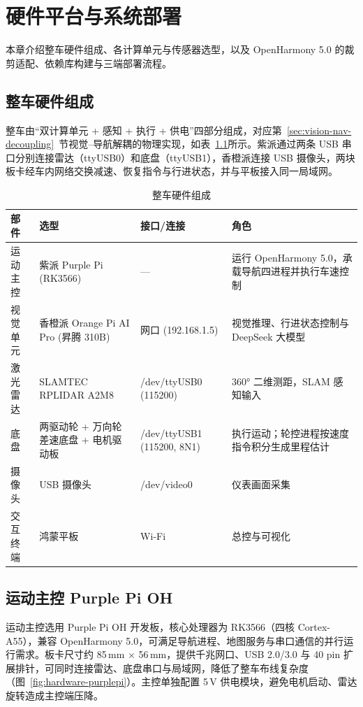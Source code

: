 \chapter{硬件平台与系统部署}
\label{ch:hardware-deploy}

本章介绍整车硬件组成、各计算单元与传感器选型，以及 OpenHarmony 5.0 的裁剪适配、依赖库构建与三端部署流程。

\section{整车硬件组成}
\label{sec:hardware-composition}

整车由“双计算单元 + 感知 + 执行 + 供电”四部分组成，对应第~\ref{sec:vision-nav-decoupling}~节视觉--导航解耦的物理实现，如表~\ref{tab:hardware}所示。紫派通过两条 USB 串口分别连接雷达（ttyUSB0）和底盘（ttyUSB1），香橙派连接 USB 摄像头，两块板卡经车内网络交换减速、恢复指令与行进状态，并与平板接入同一局域网。

\begin{table}[htbp]
\centering
\caption{整车硬件组成}
\label{tab:hardware}
\begin{tabularx}{\textwidth}{p{2.2cm}p{3cm}p{2.5cm}X}
\toprule
\textbf{部件} & \textbf{选型} & \textbf{接口/连接} & \textbf{角色} \\
\midrule
运动主控 & 紫派 Purple Pi (RK3566) & --- & 运行 OpenHarmony 5.0，承载导航四进程并执行车速控制 \\
视觉单元 & 香橙派 Orange Pi AI Pro (昇腾 310B) & 网口 (192.168.1.5) & 视觉推理、行进状态控制与 DeepSeek 大模型 \\
激光雷达 & SLAMTEC RPLIDAR A2M8 & /dev/ttyUSB0 (115200) & 360° 二维测距，SLAM 感知输入 \\
底盘 & 两驱动轮 + 万向轮差速底盘 + 电机驱动板 & /dev/ttyUSB1 (115200, 8N1) & 执行运动；轮控进程按速度指令积分生成里程估计 \\
摄像头 & USB 摄像头 & /dev/video0 & 仪表画面采集 \\
交互终端 & 鸿蒙平板 & Wi-Fi & 总控与可视化 \\
\bottomrule
\end{tabularx}
\end{table}

\section{运动主控 Purple Pi OH}
\label{sec:purplepi-hardware}

运动主控选用 Purple Pi OH 开发板，核心处理器为 RK3566（四核 Cortex-A55），兼容 OpenHarmony 5.0，可满足导航进程、地图服务与串口通信的并行运行需求。板卡尺寸约 85\,mm $\times$ 56\,mm，提供千兆网口、USB 2.0/3.0 与 40 pin 扩展排针，可同时连接雷达、底盘串口与局域网，降低了整车布线复杂度（图~\ref{fig:hardware-purplepi}）。主控单独配置 5\,V 供电模块，避免电机启动、雷达旋转造成主控端压降。

